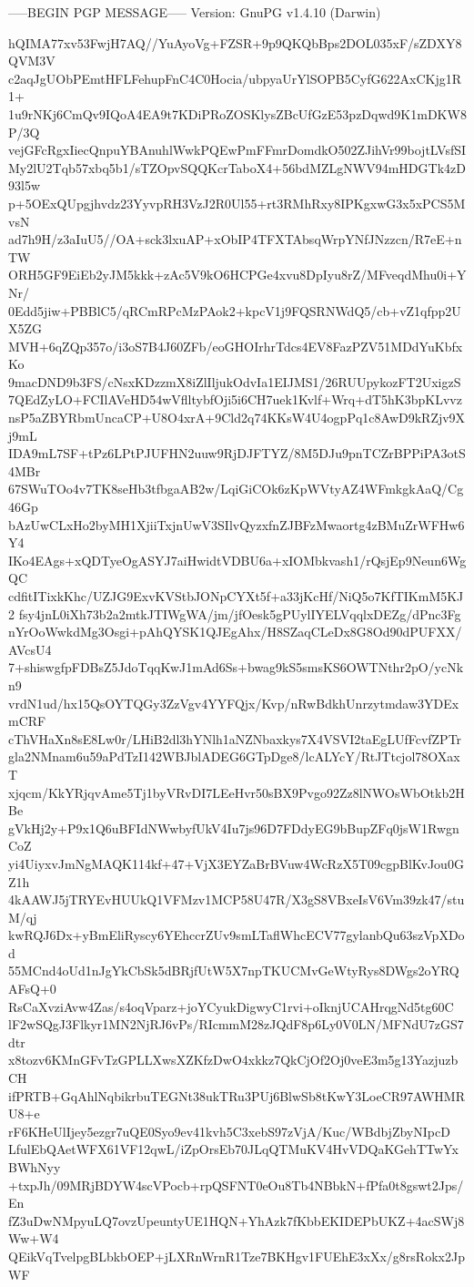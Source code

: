 -----BEGIN PGP MESSAGE-----
Version: GnuPG v1.4.10 (Darwin)

hQIMA77xv53FwjH7AQ//YuAyoVg+FZSR+9p9QKQbBps2DOL035xF/sZDXY8QVM3V
c2aqJgUObPEmtHFLFehupFnC4C0Hocia/ubpyaUrYlSOPB5CyfG622AxCKjg1R1+
1u9rNKj6CmQv9IQoA4EA9t7KDiPRoZOSKlysZBcUfGzE53pzDqwd9K1mDKW8P/3Q
vejGFcRgxIiecQnpuYBAnuhlWwkPQEwPmFFmrDomdkO502ZJihVr99bojtLVsfSI
My2lU2Tqb57xbq5b1/sTZOpvSQQKcrTaboX4+56bdMZLgNWV94mHDGTk4zD93l5w
p+5OExQUpgjhvdz23YyvpRH3VzJ2R0Ul55+rt3RMhRxy8IPKgxwG3x5xPCS5MvsN
ad7h9H/z3aIuU5//OA+sck3lxuAP+xObIP4TFXTAbsqWrpYNfJNzzcn/R7eE+nTW
ORH5GF9EiEb2yJM5kkk+zAc5V9kO6HCPGe4xvu8DpIyu8rZ/MFveqdMhu0i+YNr/
0Edd5jiw+PBBlC5/qRCmRPcMzPAok2+kpcV1j9FQSRNWdQ5/cb+vZ1qfpp2UX5ZG
MVH+6qZQp357o/i3oS7B4J60ZFb/eoGHOIrhrTdcs4EV8FazPZV51MDdYuKbfxKo
9macDND9b3FS/cNsxKDzzmX8iZlIljukOdvIa1EIJMS1/26RUUpykozFT2UxigzS
7QEdZyLO+FCIlAVeHD54wVflltybfOji5i6CH7uek1Kvlf+Wrq+dT5hK3bpKLvvz
nsP5aZBYRbmUncaCP+U8O4xrA+9Cld2q74KKsW4U4ogpPq1c8AwD9kRZjv9Xj9mL
IDA9mL7SF+tPz6LPtPJUFHN2uuw9RjDJFTYZ/8M5DJu9pnTCZrBPPiPA3otS4MBr
67SWuTOo4v7TK8seHb3tfbgaAB2w/LqiGiCOk6zKpWVtyAZ4WFmkgkAaQ/Cg46Gp
bAzUwCLxHo2byMH1XjiiTxjnUwV3SIlvQyzxfnZJBFzMwaortg4zBMuZrWFHw6Y4
IKo4EAgs+xQDTyeOgASYJ7aiHwidtVDBU6a+xIOMbkvash1/rQsjEp9Neun6WgQC
cdfitITixkKhc/UZJG9ExvKVStbJONpCYXt5f+a33jKcHf/NiQ5o7KfTIKmM5KJ2
fsy4jnL0iXh73b2a2mtkJTIWgWA/jm/jfOesk5gPUylIYELVqqlxDEZg/dPnc3Fg
nYrOoWwkdMg3Osgi+pAhQYSK1QJEgAhx/H8SZaqCLeDx8G8Od90dPUFXX/AVcsU4
7+shiswgfpFDBsZ5JdoTqqKwJ1mAd6Ss+bwag9kS5smsKS6OWTNthr2pO/ycNkn9
vrdN1ud/hx15QsOYTQGy3ZzVgv4YYFQjx/Kvp/nRwBdkhUnrzytmdaw3YDExmCRF
cThVHaXn8sE8Lw0r/LHiB2dl3hYNlh1aNZNbaxkys7X4VSVI2taEgLUfFcvfZPTr
gla2NMnam6u59aPdTzI142WBJblADEG6GTpDge8/lcALYcY/RtJTtcjol78OXaxT
xjqcm/KkYRjqvAme5Tj1byVRvDI7LEeHvr50sBX9Pvgo92Zz8lNWOsWbOtkb2HBe
gVkHj2y+P9x1Q6uBFIdNWwbyfUkV4Iu7js96D7FDdyEG9bBupZFq0jsW1RwgnCoZ
yi4UiyxvJmNgMAQK114kf+47+VjX3EYZaBrBVuw4WcRzX5T09cgpBlKvJou0GZ1h
4kAAWJ5jTRYEvHUUkQ1VFMzv1MCP58U47R/X3gS8VBxeIsV6Vm39zk47/stuM/qj
kwRQJ6Dx+yBmEliRyscy6YEhccrZUv9smLTaflWhcECV77gylanbQu63szVpXDod
55MCnd4oUd1nJgYkCbSk5dBRjfUtW5X7npTKUCMvGeWtyRys8DWgs2oYRQAFsQ+0
RsCaXvziAvw4Zas/s4oqVparz+joYCyukDigwyC1rvi+oIknjUCAHrqgNd5tg60C
lF2wSQgJ3Flkyr1MN2NjRJ6vPs/RIcmmM28zJQdF8p6Ly0V0LN/MFNdU7zGS7dtr
x8tozv6KMnGFvTzGPLLXwsXZKfzDwO4xkkz7QkCjOf2Oj0veE3m5g13YazjuzbCH
ifPRTB+GqAhlNqbikrbuTEGNt38ukTRu3PUj6BlwSb8tKwY3LoeCR97AWHMRU8+e
rF6KHeUlIjey5ezgr7uQE0Syo9ev41kvh5C3xebS97zVjA/Kuc/WBdbjZbyNIpcD
LfulEbQAetWFX61VF12qwL/iZpOrsEb70JLqQTMuKV4HvVDQaKGehTTwYxBWhNyy
+txpJh/09MRjBDYW4scVPocb+rpQSFNT0eOu8Tb4NBbkN+fPfa0t8gswt2Jps/En
fZ3uDwNMpyuLQ7ovzUpeuntyUE1HQN+YhAzk7fKbbEKIDEPbUKZ+4acSWj8Ww+W4
QEikVqTvelpgBLbkbOEP+jLXRnWrnR1Tze7BKHgv1FUEhE3xXx/g8rsRokx2JpWF

